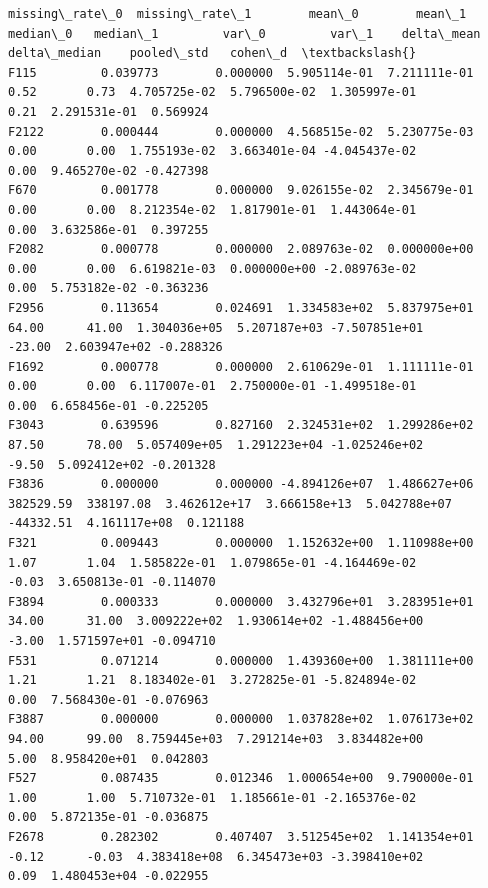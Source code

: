 \documentclass[11pt]{article}
\begin{document}
    
    \begin{Verbatim}[commandchars=\\\{\}]
       missing\_rate\_0  missing\_rate\_1        mean\_0        mean\_1   median\_0   median\_1         var\_0         var\_1    delta\_mean  delta\_median    pooled\_std   cohen\_d  \textbackslash{}
F115         0.039773        0.000000  5.905114e-01  7.211111e-01       0.52       0.73  4.705725e-02  5.796500e-02  1.305997e-01          0.21  2.291531e-01  0.569924   
F2122        0.000444        0.000000  4.568515e-02  5.230775e-03       0.00       0.00  1.755193e-02  3.663401e-04 -4.045437e-02          0.00  9.465270e-02 -0.427398   
F670         0.001778        0.000000  9.026155e-02  2.345679e-01       0.00       0.00  8.212354e-02  1.817901e-01  1.443064e-01          0.00  3.632586e-01  0.397255   
F2082        0.000778        0.000000  2.089763e-02  0.000000e+00       0.00       0.00  6.619821e-03  0.000000e+00 -2.089763e-02          0.00  5.753182e-02 -0.363236   
F2956        0.113654        0.024691  1.334583e+02  5.837975e+01      64.00      41.00  1.304036e+05  5.207187e+03 -7.507851e+01        -23.00  2.603947e+02 -0.288326   
F1692        0.000778        0.000000  2.610629e-01  1.111111e-01       0.00       0.00  6.117007e-01  2.750000e-01 -1.499518e-01          0.00  6.658456e-01 -0.225205   
F3043        0.639596        0.827160  2.324531e+02  1.299286e+02      87.50      78.00  5.057409e+05  1.291223e+04 -1.025246e+02         -9.50  5.092412e+02 -0.201328   
F3836        0.000000        0.000000 -4.894126e+07  1.486627e+06  382529.59  338197.08  3.462612e+17  3.666158e+13  5.042788e+07     -44332.51  4.161117e+08  0.121188   
F321         0.009443        0.000000  1.152632e+00  1.110988e+00       1.07       1.04  1.585822e-01  1.079865e-01 -4.164469e-02         -0.03  3.650813e-01 -0.114070   
F3894        0.000333        0.000000  3.432796e+01  3.283951e+01      34.00      31.00  3.009222e+02  1.930614e+02 -1.488456e+00         -3.00  1.571597e+01 -0.094710   
F531         0.071214        0.000000  1.439360e+00  1.381111e+00       1.21       1.21  8.183402e-01  3.272825e-01 -5.824894e-02          0.00  7.568430e-01 -0.076963   
F3887        0.000000        0.000000  1.037828e+02  1.076173e+02      94.00      99.00  8.759445e+03  7.291214e+03  3.834482e+00          5.00  8.958420e+01  0.042803   
F527         0.087435        0.012346  1.000654e+00  9.790000e-01       1.00       1.00  5.710732e-01  1.185661e-01 -2.165376e-02          0.00  5.872135e-01 -0.036875   
F2678        0.282302        0.407407  3.512545e+02  1.141354e+01      -0.12      -0.03  4.383418e+08  6.345473e+03 -3.398410e+02          0.09  1.480453e+04 -0.022955   

\end{Verbatim}
\end{document}
